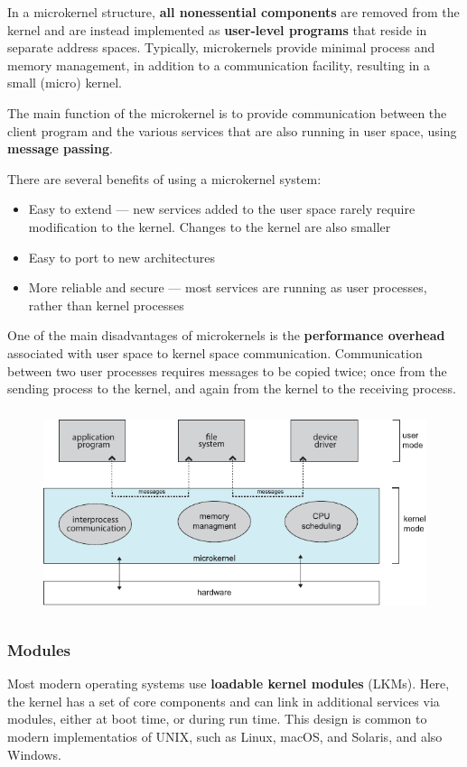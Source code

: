 \documentclass{article}
\begin{document}
In a microkernel structure, \textbf{all nonessential components} are removed from the kernel
and are instead implemented as \textbf{user-level programs} that reside in separate address spaces.
Typically, microkernels provide minimal process and memory management, in addition to a communication facility,
resulting in a small (micro) kernel.

The main function of the microkernel is to provide communication
between the client program and the various services that are also running in
user space, using \textbf{message passing}.

There are several benefits of using a microkernel system:
\begin{itemize}
    \item Easy to extend --- new services added to the user space rarely require modification to the kernel. Changes to the kernel are also smaller
    \item Easy to port to new architectures
    \item More reliable and secure --- most services are running as user processes, rather than kernel processes
\end{itemize}
One of the main disadvantages of microkernels is the \textbf{performance overhead} associated with
user space to kernel space communication. Communication between two user processes
requires messages to be copied twice; once from the sending process to the kernel, and again from the kernel
to the receiving process.
\begin{figure}[H]
    \centering
    \includegraphics[height = 6cm]{figures/microkernel_structure.pdf}
\end{figure}
\subsubsection{Modules}
Most modern operating systems use \textbf{loadable kernel modules} (LKMs). Here, the kernel has a set of
core components and can link in additional services via modules, either at boot time, or during run time.
This design is common to modern implementatios of UNIX, such as Linux, macOS, and Solaris, and also Windows.
\end{document}
